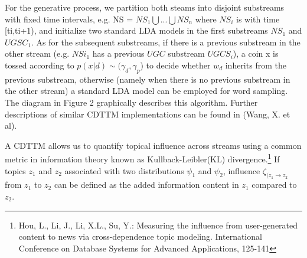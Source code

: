 \documentclass{article}
\begin{document}
For the generative process, we partition both steams into disjoint substreams with fixed time intervals, e.g. NS = \begin{math} NS_1  \bigcup ... \bigcup NS_n \end{math} where \begin{math} NS_i \end{math} is with time [ti,ti+1), and initialize two standard LDA models in the first substreams \begin{math} NS_1 \end{math} and \begin{math} UGSC_1 \end{math}. As for the subsequent substreams, if there is a previous substream in the other stream (e.g. \begin{math} NSi_1 \end{math} has a previous \begin{math} UGC \end{math} substream \begin{math} UGCS_i \end{math}), a coin x is tossed according to \begin{math} p(x|d) \sim (\gamma_d, \gamma_p \end{math}) to decide whether \begin{math} w_d \end{math} inherits from the previous substream, otherwise (namely when there is no previous substream in the other stream) a standard LDA model can be employed for word sampling. The diagram in Figure 2 graphically describes this algorithm. Further descriptions of similar CDTTM implementations can be found in (Wang, X. et al). 

A CDTTM allows us to quantify topical influence across streams using a common metric in information theory known as Kullback-Leibler(KL) divergence.\footnote{Hou, L., Li, J., Li, X.L., Su, Y.: Measuring the influence from user-generated content to news via cross-dependence topic modeling. International Conference on Database Systems for Advanced Applications, 125-141} If topics $z_{1}$ and $z_{2}$ associated with two distributions \begin{math} \psi_1 \end{math} and \begin{math} \psi_2 \end{math}, influence \begin{math} \zeta_{(z_{1} \rightarrow z_{2}} \end{math} from $z_{1}$ to $z_{2}$ can be defined as the added information content in $z_{1}$ compared to $z_{2}$.
\end{document}
